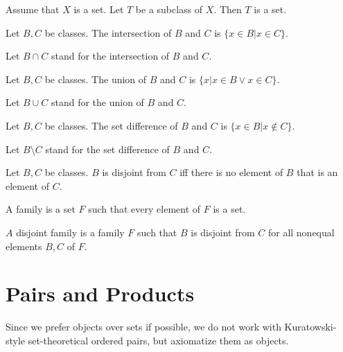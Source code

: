 \documentclass[11pt]{article}
\begin{document}
\begin{forthel}
\begin{axiom}  Assume that $X$ is a set.
Let $T$ be a subclass of $X$. Then $T$ is a set.
\end{axiom}


\begin{definition}
    Let $B, C$ be classes.
    The intersection of $B$ and $C$ is $\{ x \in B | x \in C\}$.
\end{definition}
Let $B\cap C$ stand for the intersection of $B$ and $C$.

\begin{definition}
    Let $B, C$ be classes.
    The union of $B$ and $C$ is $\{ x | x \in B \vee x\in C\}$.
\end{definition}
Let $B\cup C$ stand for the union of $B$ and $C$.

\begin{definition}
    Let $B, C$ be classes.
    The set difference of $B$ and $C$ is $\{ x\in B | x\notin C\}$.
\end{definition}
Let $B\setminus C$ stand for the set difference of $B$ and $C$.

\begin{definition}
    Let $B, C$ be classes.
    $B$ is disjoint from $C$ iff there is no element of $B$ that is an element of $C$.
\end{definition}

\begin{definition}
    A family is a set $F$ such that every element of $F$ is a set.
\end{definition}

\begin{definition}
    $A$ disjoint family is a family $F$ such that
    $B$ is disjoint from $C$ for all nonequal elements $B, C$ of $F$.
\end{definition}



\end{forthel}

\section{Pairs and Products}
Since we prefer objects over sets if possible, we do not work
with Kuratowski-style set-theoretical ordered pairs, but
axiomatize them as objects.
\end{document}
